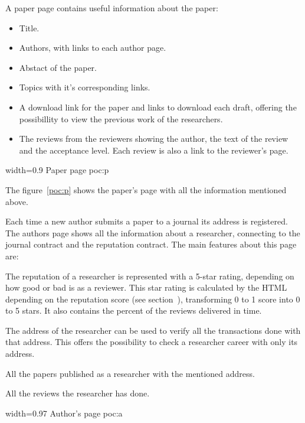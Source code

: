 

A paper page contains useful information about the paper:
\begin{itemize}
\item Title.
\item Authors, with links to each author page.
\item Abstact of the paper.
\item Topics with it's corresponding links.
\item A download link for the paper and links to download each draft, offering
  the possibillity to view the previous work of the researchers.
\item The reviews from the reviewers showing the author, the text of the review
  and the acceptance level. Each review is also a link to the reviewer's page.
\end{itemize}
%
{width=0.9\linewidth}%
{Paper page}%
{poc:p}

The figure~\ref{poc:p} shows the paper's page with all the information mentioned
above.


Each time a new author submits a paper to a journal its address is registered.
The authors page shows all the information about a researcher, connecting to the
journal contract and the reputation contract. The main features about this page
are:

\begin{itemize}
   The reputation of a researcher is represented with a 5-star
  rating, depending on how good or bad is as a reviewer. This star rating is
  calculated by the HTML depending on the reputation score (see section~),
  transforming 0 to 1 score into 0 to 5 stars. It also contains the percent of
  the reviews delivered in time.

   The address of the researcher can be used to verify
  all the transactions done with that address. This offers the possibility to
  check a researcher career with only its address.

   All the papers published as a researcher with the
  mentioned address.

   All the reviews the researcher has done. 
\end{itemize}

%
{width=0.97\linewidth}%
{Author's page}%
{poc:a}


